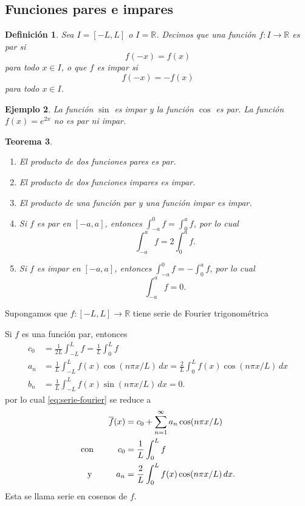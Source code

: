 \documentclass[11pt,letterpaper]{report}
\newtheorem{defn}{Definición}[chapter]
\newtheorem{theorem}[defn]{Teorema}
\newtheorem{example}[defn]{Ejemplo}
\newcommand\R{\mathbb R}
\newcommand\<{\langle}
\renewcommand\>{\rangle}
\begin{document}
\subsection{Funciones pares e impares}

\begin{defn}
  Sea $I=[-L,L]$ o $I=\R$.
  Decimos que una función $f:I\to\R$ es par si
  \[
    f(-x) = f(x)
  \]
  para todo $x\in I$, o que $f$ es impar si
  \[
    f(-x) = -f(x)
  \]
  para todo $x\in I$.
\end{defn}

\begin{example}
  La función $\sin$ es impar y la función $\cos$ es par.
  La función $f(x)=e^{2x}$ no es par ni impar.
\end{example}

\begin{theorem}
  \begin{enumerate}
    \item El producto de dos funciones pares es par.
    \item El producto de dos funciones impares es impar.
    \item El producto de una función par y una función impar es impar.
    \item Si $f$ es par en $[-a,a]$, entonces
      $\int_{-a}^{0}f=\int_{0}^{a}f$, por lo cual
      \[
        \int_{-a}^{a}f = 2\int_{0}^{a}f
      .\]
    \item Si $f$ es impar en $[-a,a]$, entonces
      $\int_{-a}^{0}f=-\int_{0}^{a}f$, por lo cual
      \[
        \int_{-a}^{a}f = 0
      .\]
  \end{enumerate}
\end{theorem}

Supongamos que $f:[-L,L]\to\R$ tiene serie de Fourier trigonométrica

Si $f$ es una función par, entonces
\begin{align*}
  c_0 &= \frac{1}{2L}\int_{-L}^L f = \frac{1}{L}\int_{0}^L f \\
  a_n
    &= \frac{1}{L}\int_{-L}^L f(x)\cos(n\pi x/L)\,dx
    = \frac{2}{L}\int_{0}^L f(x)\cos(n\pi x/L)\,dx \\
  b_n
    &= \frac{1}{L}\int_{-L}^L f(x)\sin(n\pi x/L)\,dx
    = 0.
\end{align*}
por lo cual \eqref{eq:serie-fourier} se reduce a
\begin{equation}\label{eq:fourier-par}
\begin{aligned}
  \overline{f}(x)
  &=
  c_0
  +
  \sum_{n=1}^{\infty}a_n\cos(n\pi x/L) \\
  \text{con} \hspace{10mm}
  c_0 &= \frac{1}{L}\int_{0}^L f \\
  \text{y} \hspace{10mm}
  a_n &= \frac{2}{L}\int_{0}^L f(x)\cos(n\pi x/L)\,dx.
\end{aligned}
\end{equation}
Esta se llama serie en cosenos de $f$.
\end{document}
